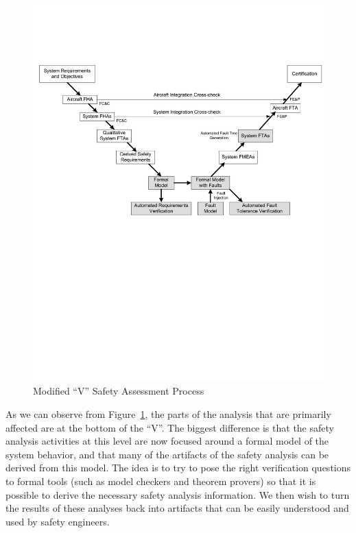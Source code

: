 \begin{figure}
\includegraphics[trim=15 350 0 125, clip, scale=.60]{Mod_V_Process_FaultModel}
\caption{Modified ``V'' Safety Assessment Process} \label{fig:Vmod}
\end{figure}


As we can observe from Figure~\ref{fig:Vmod}, the parts of the analysis that are
primarily affected are at the bottom of the ``V''. The biggest difference is that
the safety analysis activities at this level are now focused around a formal
model of the system behavior, and that many of the artifacts of the safety
analysis can be derived from this model. The idea is to try to pose the right
verification questions to formal tools (such as model checkers and theorem
provers) so that it is possible to derive the necessary safety analysis
information. We then wish to turn the results of these analyses back into
artifacts that can be easily understood and used by safety engineers.
